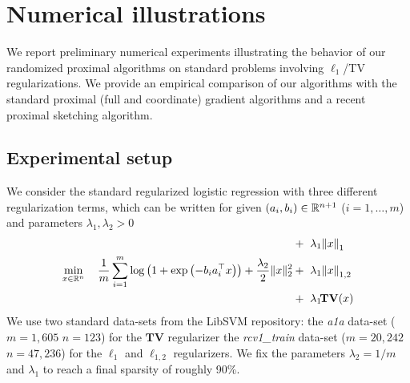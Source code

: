 \section{Numerical illustrations}\label{sec:mor-numerical}
We report preliminary numerical experiments illustrating the behavior of our randomized proximal algorithms on standard problems involving $\ell_1$/TV regularizations. We provide an empirical comparison of our algorithms
with the standard proximal (full and coordinate) gradient algorithms %
and a recent proximal sketching algorithm.


\subsection{Experimental setup}


We consider the standard regularized logistic regression with three different regularization terms,
which can be written for given $(a_i,b_i)\in\mathbb{R}^{n+1}$ ($i=1,\ldots,m$) and parameters $\lambda_1,\lambda_2>0$
\begin{subequations}
\begin{align}
 &+ ~\lambda_1\!\left\|x\right\|_1\label{eq:logl1}\\
 \min_{x\in \mathbb{R}^n}~~~\frac{1}{m}\sum\limits_{i=1}^m \log\left(1 + \exp\left(-b_ia_i^\top x\right)\right) + \frac{\lambda_2}{2}\|x\|_2^2 &+ ~  \lambda_1\!\left\|x\right\|_{1,2}\label{eq:logl12}\\
 &+~\lambda_1\!\mathbf{TV}(x)\label{eq:logtv}
\end{align}
\end{subequations}
We use two standard data-sets from the LibSVM repository: the 
\emph{a1a} data-set ($m=1,605$ $n=123$) for the $\mathbf{TV}$ regularizer
the \emph{rcv1\_train} data-set ($m=20,242$ $n=47,236$) for the $\ell_1$ and $\ell_{1,2}$ regularizers. We fix the parameters $\lambda_2=1/m$ and $\lambda_1$ to reach a final sparsity of roughly 90\%. 

